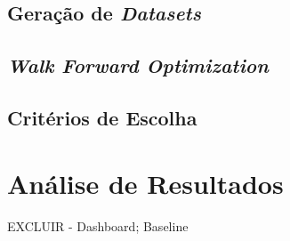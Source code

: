 \subsection{Geração de \textit{Datasets}}
\paragraph{}

\subsection{\textit{Walk Forward Optimization}}
\paragraph{}

\subsection{Critérios de Escolha}
\paragraph{}


\section{Análise de Resultados}
\paragraph{} EXCLUIR - Dashboard; Baseline